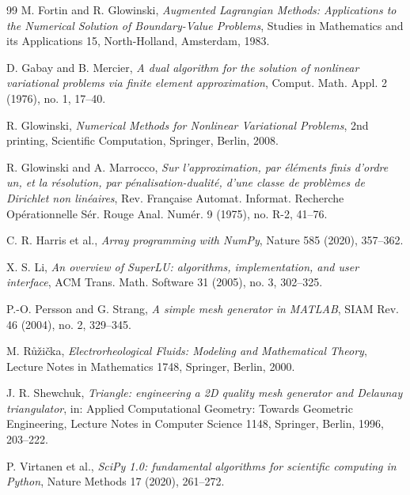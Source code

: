 \documentclass[11pt]{amsart}
\theoremstyle{definition}
\theoremstyle{remark}
\numberwithin{equation}{section}
\begin{document}
\begin{thebibliography}{99}
 {\sc M. Fortin and R. Glowinski}, \emph{Augmented Lagrangian Methods: Applications to the Numerical Solution of Boundary-Value Problems}, Studies in Mathematics and its Applications 15, North-Holland, Amsterdam, 1983.

 {\sc D. Gabay and B. Mercier}, \emph{A dual algorithm for the solution of nonlinear variational problems via finite element approximation}, Comput. Math. Appl. 2 (1976), no. 1, 17--40.

 {\sc R. Glowinski}, \emph{Numerical Methods for Nonlinear Variational Problems}, 2nd printing, Scientific Computation, Springer, Berlin, 2008.

 {\sc R. Glowinski and A. Marrocco}, \emph{Sur l'approximation, par \'el\'ements finis d'ordre un, et la r\'esolution, par p\'enalisation-dualit\'e, d'une classe de probl\`emes de Dirichlet non lin\'eaires}, Rev. Fran\c{c}aise Automat. Informat. Recherche Op\'erationnelle S\'er. Rouge Anal. Num\'er. 9 (1975), no. R-2, 41--76.

 {\sc C. R. Harris et al.}, \emph{Array programming with NumPy}, Nature 585 (2020), 357--362.

 {\sc X. S. Li}, \emph{An overview of SuperLU: algorithms, implementation, and user interface}, ACM Trans. Math. Software 31 (2005), no. 3, 302--325.

 {\sc P.-O. Persson and G. Strang}, \emph{A simple mesh generator in MATLAB}, SIAM Rev. 46 (2004), no. 2, 329--345.

  {\sc M. R\r{u}\v{z}i\v{c}ka}, \emph{Electrorheological Fluids: Modeling and Mathematical Theory}, Lecture Notes in Mathematics 1748, Springer, Berlin, 2000.

 {\sc J. R. Shewchuk}, \emph{Triangle: engineering a 2D quality mesh generator and Delaunay triangulator}, in: Applied Computational Geometry: Towards Geometric Engineering, Lecture Notes in Computer Science 1148, Springer, Berlin, 1996, 203--222.

 {\sc P. Virtanen et al.}, \emph{SciPy 1.0: fundamental algorithms for scientific computing in Python}, Nature Methods 17 (2020), 261--272.

\end{thebibliography}
\end{document}
